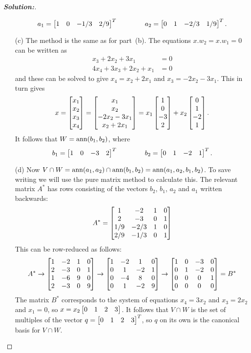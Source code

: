\documentclass[a4paper]{amsart}
\theoremstyle{definition}
\newenvironment{solution}{\begin{proof}[\textbf{Solution:}] \vphantom{u}}{\end{proof}}
\begin{document}
\begin{solution}
\begin{itemize}
   \[ a_1 = \left[\begin{matrix} 1&0&-1/3&2/9\end{matrix}\right]^T \hspace{4em}
      a_2 = \left[\begin{matrix} 0&1&-2/3&1/9\end{matrix}\right]^T. 
   \]
  \item[(c)] The method is the same as for part~(b).  The equations
   $x.w_2=x.w_1=0$ can be written as
   \begin{align*}
    x_3 + 2x_2 + 3x_1 &= 0 \\
    4x_4+ 3x_3 + 2x_2 + x_1 &= 0 
   \end{align*}
   and these can be solved to give $x_4=x_2+2x_1$ and
   $x_3=-2x_2-3x_1$.  This in turn gives
   \[ x = \left[\begin{matrix} x_1\\x_2\\x_3\\x_4 \end{matrix}\right] 
      = \left[\begin{matrix} x_1 \\ x_2 \\ -2x_2-3x_1 \\ x_2+2x_1 \end{matrix}\right] 
      = x_1 \left[\begin{matrix} 1 \\ 0 \\ -3 \\ 2 \end{matrix}\right] +
        x_2 \left[\begin{matrix} 0 \\ 1 \\ -2 \\ 1 \end{matrix}\right].
   \]
   It follows that $W=\operatorname{ann}(b_1,b_2)$, where 
   \[ b_1 = \left[\begin{matrix} 1&0&-3&2\end{matrix}\right]^T \hspace{4em}
      b_2 = \left[\begin{matrix} 0&1&-2&1\end{matrix}\right]^T. 
   \]
  \item[(d)] Now
   $V\cap W=\operatorname{ann}(a_1,a_2)\cap\operatorname{ann}(b_1,b_2)=\operatorname{ann}(a_1,a_2,b_1,b_2)$.  
   To save writing we will use the pure matrix method to calculate
   this.  The relevant matrix $A^*$ has rows consisting of the vectors
   $b_2$, $b_1$, $a_2$ and $a_1$ written backwards:
   \[ A^* =
       \left[\begin{matrix}
        1 & -2 & 1 & 0 \\
        2 & -3 & 0 & 1 \\
        1/9 & -2/3 & 1 & 0 \\
        2/9 & -1/3 & 0 & 1
       \end{matrix}\right]
   \]
   This can be row-reduced as follows:
   \[ A^* \to 
       \left[\begin{matrix}
        1 & -2 & 1 & 0 \\
        2 & -3 & 0 & 1 \\
        1 & -6 & 9 & 0 \\
        2 & -3 & 0 & 9
       \end{matrix}\right]
       \to
       \left[\begin{matrix}
        1 & -2 & 1 & 0 \\
        0 &  1 &-2 & 1 \\
        0 & -4 & 8 & 0 \\
        0 &  1 &-2 & 9
       \end{matrix}\right]
       \to
       \left[\begin{matrix}
        1 &  0 &-3 & 0 \\
        0 &  1 &-2 & 0 \\
        0 &  0 & 0 & 1 \\
        0 &  0 & 0 & 0
       \end{matrix}\right]  =B^*
   \]
   The matrix $B^*$ corresponds to the system of equations $x_4=3x_2$
   and $x_3=2x_2$ and $x_1=0$, so $x=x_2\left[\begin{matrix} 0&1&2&3\end{matrix}\right]$.  It follows
   that $V\cap W$ is the set of multiples of the vector
   $q=\left[\begin{matrix} 0&1&2&3\end{matrix}\right]^T$, so $q$ on its own is the canonical basis
   for $V\cap W$.
 \end{itemize}
\end{solution}
\end{document}
